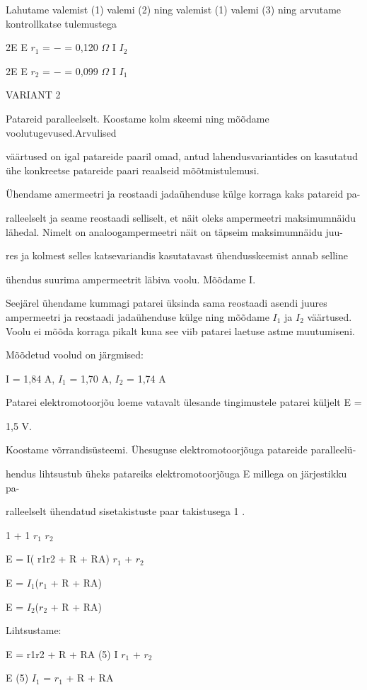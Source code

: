 Lahutame valemist (1) valemi (2) ning valemist (1) valemi (3) ning arvutame kontrollkatse tulemustega

2E E $r_1$ = $-$ = 0,120 $\Omega$ I $I_2$

2E E $r_2$ = $-$ = 0,099 $\Omega$ I $I_1$

VARIANT 2

Patareid paralleelselt. Koostame kolm skeemi ning mõõdame voolutugevused.Arvulised

väärtused on igal patareide paaril omad, antud lahendusvariantides on kasutatud ühe konkreetse patareide paari reaalseid mõõtmistulemusi.

Ühendame amermeetri ja reostaadi jadaühenduse külge korraga kaks patareid pa-

ralleelselt ja seame reostaadi selliselt, et näit oleks ampermeetri maksimumnäidu lähedal. Nimelt on analoogampermeetri näit on täpseim maksimumnäidu juu-

res ja kolmest selles katsevariandis kasutatavast ühendusskeemist annab selline

ühendus suurima ampermeetrit läbiva voolu. Mõõdame I.

Seejärel ühendame kummagi patarei üksinda sama reostaadi asendi juures ampermeetri ja reostaadi jadaühenduse külge ning mõõdame $I_1$ ja $I_2$ väärtused. Voolu ei mõõda korraga pikalt kuna see viib patarei laetuse astme muutumiseni.

Mõõdetud voolud on järgmised:

I = 1,84 A, $I_1$ = 1,70 A, $I_2$ = 1,74 A

Patarei elektromotoorjõu loeme vatavalt ülesande tingimustele patarei küljelt E =

1,5 V.

Koostame võrrandisüsteemi. Ühesuguse elektromotoorjõuga patareide paralleelü-

hendus lihtsustub üheks patareiks elektromotoorjõuga E millega on järjestikku pa-

ralleelselt ühendatud sisetakistuste paar takistusega 1 .

1 + 1 $r_1$ $r_2$

E = I( r1r2 + R + RA) $r_1$ + $r_2$

E = $I_1$($r_1$ + R + RA)

E = $I_2$($r_2$ + R + RA)

Lihtsustame:

E = r1r2 + R + RA (5) I $r_1$ + $r_2$

E (5) $I_1$ = $r_1$ + R + RA

